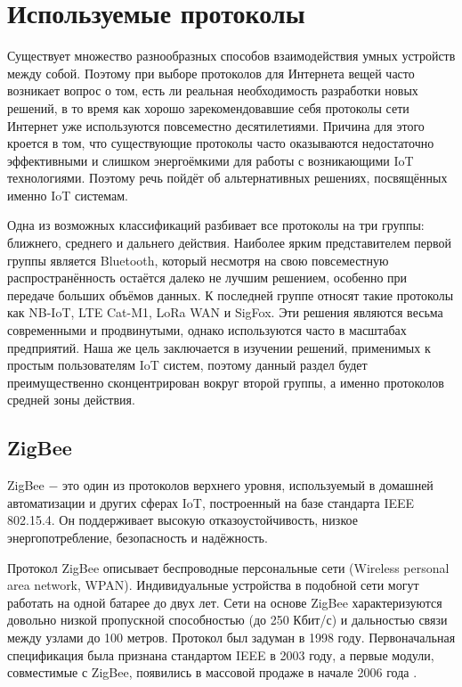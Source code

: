 	
	\section{Используемые протоколы}
	
	Существует множество разнообразных способов взаимодействия умных устройств между собой. Поэтому
	при выборе протоколов для Интернета вещей часто возникает вопрос о том, есть ли реальная необходимость
	разработки новых решений, в то время как хорошо зарекомендовавшие себя протоколы сети Интернет уже
	используются повсеместно десятилетиями. Причина для этого кроется в том, что существующие протоколы
	часто оказываются недостаточно эффективными и слишком энергоёмкими для работы с возникающими
	IoT технологиями. Поэтому речь пойдёт об альтернативных решениях, посвящённых именно IoT системам.
	
	Одна из возможных классификаций разбивает все протоколы на три группы: ближнего, среднего и дальнего
	действия. Наиболее ярким представителем первой группы является Bluetooth, который несмотря на свою
	повсеместную распространённость остаётся далеко не лучшим решением, особенно при передаче больших
	объёмов данных. К последней группе относят такие протоколы как NB-IoT, LTE Cat-M1, LoRa WAN и SigFox.
	Эти решения являются весьма современными и продвинутыми, однако используются часто в масштабах
	предприятий. Наша же цель заключается в изучении решений, применимых к простым пользователям 
	IoT систем, поэтому данный раздел будет преимущественно сконцентрирован вокруг второй группы, 
	а именно протоколов средней зоны действия.
	
	
	

	\subsection{ZigBee}
	ZigBee $-$ это один из протоколов верхнего уровня, используемый в домашней автоматизации и других
	сферах IoT, построенный на базе стандарта IEEE 802.15.4. Он поддерживает высокую отказоустойчивость, 
	низкое энергопотребление, безопасность и надёжность.
	
	Протокол ZigBee описывает беспроводные персональные сети (Wireless personal area network, WPAN).
	Индивидуальные устройства в подобной сети могут работать на одной батарее до двух лет.
	Сети на основе ZigBee характеризуются довольно низкой пропускной способностью (до 250 Кбит/с) и
	дальностью связи между узлами до 100 метров. Протокол был задуман в 1998 году. Первоначальная 
	спецификация была признана стандартом IEEE в 2003 году, а первые модули, совместимые с ZigBee, 
	появились в массовой продаже в начале 2006 года \cite{zigbee-certified-products}.
	
